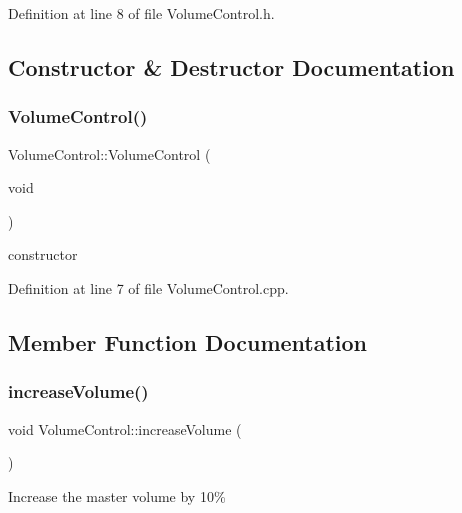 Definition at line 8 of file Volume\+Control.\+h.



\subsection{Constructor \& Destructor Documentation}
\mbox{\label{class_ubuntu_controller_1_1_volume_control_a3cc73bb232bd87f8385da0440126c38c}} 
\subsubsection{\texorpdfstring{Volume\+Control()}{VolumeControl()}}
{\footnotesize\ttfamily Volume\+Control\+::\+Volume\+Control (\begin{DoxyParamCaption}\item[{void}]{ }\end{DoxyParamCaption})}

constructor 

Definition at line 7 of file Volume\+Control.\+cpp.



\subsection{Member Function Documentation}
\mbox{\label{class_ubuntu_controller_1_1_volume_control_a6b51293368c1740b9bee0b8a4e7ed421}} 
\subsubsection{\texorpdfstring{increase\+Volume()}{increaseVolume()}}
{\footnotesize\ttfamily void Volume\+Control\+::increase\+Volume (\begin{DoxyParamCaption}{ }\end{DoxyParamCaption})}

Increase the master volume by 10\% 

